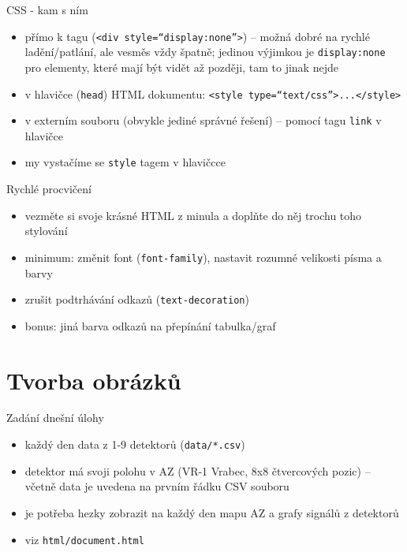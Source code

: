 \documentclass{beamer}
\begin{document}
\begin{frame}{CSS - kam s ním}
  \begin{itemize}
    \item přímo k tagu (\texttt{<div style=``display:none''>}) -- možná dobré na rychlé ladění/patlání, ale vesměs vždy špatně; jedinou výjimkou je \texttt{display:none} pro elementy, které mají být vidět až později, tam to jinak nejde
    \item v hlavičce (\texttt{head}) HTML dokumentu: \texttt{<style type=``text/css''>...</style>}
    \item v externím souboru (obvykle jediné správné řešení) -- pomocí tagu \texttt{link} v hlavičce
    \item my vystačíme se \texttt{style} tagem v hlavičcce
  \end{itemize}
\end{frame}

\begin{frame}{Rychlé procvičení}
  \begin{itemize}
    \item vezměte si svoje krásné HTML z minula a doplňte do něj trochu toho stylování
    \item minimum: změnit font (\texttt{font-family}), nastavit rozumné velikosti písma a barvy
    \item zrušit podtrhávání odkazů (\texttt{text-decoration})
    \item bonus: jiná barva odkazů na přepínání tabulka/graf
  \end{itemize}
\end{frame}

\section{Tvorba obrázků}

\begin{frame}{Zadání dnešní úlohy}
  \begin{itemize}
    \item každý den data z 1-9 detektorů (\texttt{data/*.csv})
    \item detektor má svoji polohu v AZ (VR-1 Vrabec, 8x8 čtvercových pozic) -- včetně data je uvedena na prvním řádku CSV souboru
    \item je potřeba hezky zobrazit na každý den mapu AZ a grafy signálů z detektorů
    \item viz \texttt{html/document.html}
  \end{itemize}
\end{frame}
\end{document}
